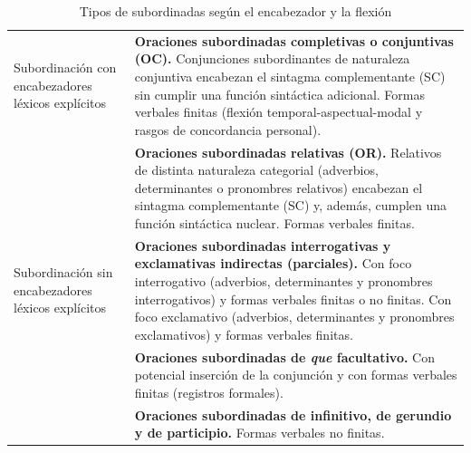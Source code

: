 {\small
\begin{longtable}{@{}>{\raggedright\arraybackslash}p{40mm}
    >{\raggedright\arraybackslash}p{83mm}@{}}
  \caption{Tipos de subordinadas según el encabezador y la flexión}\label{tab:13-tipos}\\
  \toprule
  \endfirsthead
  \toprule
  \endhead
  Subordinación con encabezadores léxicos explícitos &
    \textbf{Oraciones subordinadas completivas o conjuntivas (OC).} Conjunciones
    subordinantes de naturaleza conjuntiva encabezan el sintagma complementante
    (SC) sin cumplir una función sintáctica adicional. Formas verbales finitas
    (flexión temporal-aspectual-modal y rasgos de concordancia personal). \\
  \addlinespace
  & \textbf{Oraciones subordinadas relativas (OR).} Relativos de distinta
    naturaleza categorial (adverbios, determinantes o pronombres relativos)
    encabezan el sintagma complementante (SC) y, además, cumplen una función
    sintáctica nuclear. Formas verbales finitas. \\
  \midrule
  Subordinación sin encabezadores léxicos explícitos &
    \textbf{Oraciones subordinadas interrogativas y exclamativas indirectas
    (parciales).} Con foco interrogativo (adverbios, determinantes y pronombres
    interrogativos) y formas verbales finitas o no finitas. Con foco exclamativo
    (adverbios, determinantes y pronombres exclamativos) y formas verbales
    finitas. \\
  \addlinespace
  & \textbf{Oraciones subordinadas de \textit{que} facultativo.} Con potencial
    inserción de la conjunción y con formas verbales finitas (registros
    formales). \\
  \addlinespace
  & \textbf{Oraciones subordinadas de infinitivo, de gerundio y de participio.}
    Formas verbales no finitas. \\
  \bottomrule
\end{longtable}}

